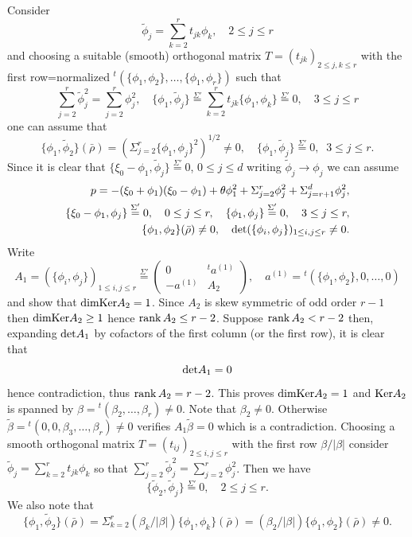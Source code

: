 \documentclass[12pt,leqno]{article} %
\def\be{\beta}
\def\sieq{\overset{\Sigma'}{=}}
\def\bro{\bar\rho}
\def\bro{\bar\rho}
\numberwithin{equation}{section}
\begin{document}
%
%
Consider
%
\[
\tilde\phi_j=\sum_{k=2}^rt_{jk}\phi_k,\quad 2\leq j\leq r
\]
%
and choosing a suitable (smooth) orthogonal matrix $T=(t_{jk})_{2\leq j, k\leq r}$ with the first row=normalized ${^t}(\{\phi_1,\phi_2\},\ldots,\{\phi_1,\phi_r\})$ such that
%
\[
\sum_{j=2}^r{\tilde\phi_j^2}= \sum_{j=2}^r\phi_j^2,\quad \{\phi_1,\tilde\phi_j\}\sieq \sum_{k=2}^rt_{jk}\{\phi_1,\phi_k\}\sieq 0,\quad 3\leq j\leq r
\]
%
one can assume that
%
\[
\{\phi_1,\tilde\phi_2\}(\bro)=(\Sigma_{j=2}^r\{\phi_1,\phi_j\}^2)^{1/2}\neq 0,\quad \{\phi_1,\tilde\phi_j\}\sieq 0,\;\;3\leq j\leq r.
\]
%
Since it is clear that $\{\xi_0-\phi_1,\tilde\phi_j\}\sieq 0$, $0\leq j\leq d$ 
writing $\tilde\phi_j\to \phi_j$ we can assume
%
%
\begin{equation}
\label{eq:form:zantei}
\begin{split}
p=-(\xi_0+\phi_1)(\xi_0-\phi_1)+\theta \phi_1^2+\Sigma_{j=2}^r\phi_j^2+\Sigma_{j=r+1}^d\phi_j^2,\\
\{\xi_0-\phi_1,\phi_j\}\sieq 0,\quad 0\leq j\leq r,\quad \{\phi_1,\phi_j\}\sieq 0,\quad 3\leq j\leq r,\\
 \{\phi_1,\phi_2\}(\bro)\neq 0,\quad {\rm det}(\{\phi_i,\phi_j\})_{1\leq i,j\leq r}\neq 0.
\end{split}
\end{equation}
%
Write
%
\[
A_1=(\{\phi_i,\phi_j\})_{1\leq i, j\leq r}\sieq \begin{pmatrix}0&{^t}a^{(1)}\\
-a^{(1)}&A_2\end{pmatrix},\quad a^{(1)}={^t}(\{\phi_1,\phi_2\},0,\ldots,0)
\]
%
and show that ${\rm dim Ker}A_2=1$. Since $A_2$ is skew symmetric of odd order $r-1$ then ${\rm dim Ker} A_2\geq 1$ 
hence ${\rm rank\,}A_2\leq r-2$. Suppose ${\rm rank\,}A_2< r-2$ then, expanding ${\rm det}A_1$ by cofactors of the first column (or the first row),  it is clear that
%
\[
{\rm det}A_1=0
\]
%
hence contradiction, thus ${\rm rank\,}A_2=r-2$.
This proves ${\rm dim Ker} A_2= 1$ and ${\rm Ker} A_2$ is spanned by $\be={^t}(\be_2,\ldots,\be_r)\neq 0$. Note that $\be_2\neq0$. Otherwise $\tilde\be={^t}(0,0,\be_3,\ldots,\be_r)\neq 0$ verifies $A_1\tilde\be=0$ which is a contradiction. Choosing a smooth orthogonal matrix $T=(t_{ij})_{2\leq i,j\leq r}$ with the first row $
\be/|\be|$ 
consider ${\tilde \phi_j}=\sum_{k=2}^rt_{jk}\phi_k$ so that $\sum_{j=2}^r{\tilde\phi_j^2}=\sum_{j=2}^r\phi_j^2$. Then we have
%
\[
\{\tilde\phi_2,\tilde\phi_j\}\sieq 0,\quad 2\leq j\leq r.
\]
%
We also note that
%
\[
\{\phi_1,\tilde\phi_2\}(\bro)=\Sigma_{k=2}^r(\be_k/|\be|)\{\phi_1,\phi_k\}(\bro)=(\be_2/|\be|)\{\phi_1,\phi_2\}(\bro)\neq 0.
\]
\end{document}
